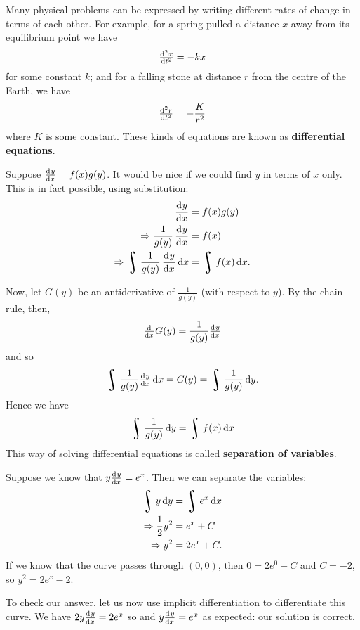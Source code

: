 


Many physical problems can be expressed by writing different rates of change in terms of each other. For example,
for a spring pulled a distance $ x $ away from its equilibrium point we have
\begin{displaymath}
  \od[2]{x}{t} = -kx
\end{displaymath}
for some constant $ k $; and for a falling stone at distance $ r $ from the centre of the Earth, we have
\begin{displaymath}
  \od[2]{r}{t} = -\frac{K}{r^2}
\end{displaymath}
where $ K $ is some constant. These kinds of equations are known as \textbf{differential equations}.

Suppose $ \od{y}{x} = f(x) g(y) $. It would be nice if we could find $ y $ in terms of $ x $ only. This
is in fact possible, using substitution:
\begin{align*}
  \dod{y}{x} &= f(x) g(y) \\
  \Rightarrow \frac{1}{g(y)} \dod{y}{x} &= f(x)\\
  \Rightarrow \rint \frac{1}{g(y)} \dod{y}{x} \dif{x} &= \rint f(x) \dif{x}.
\end{align*}

Now, let $ G(y) $ be an antiderivative of $ \frac{1}{g(y)} $ (with respect to $ y $). By the chain rule, then,
\begin{displaymath}
  \od{}{x} G(y) = \frac{1}{g(y)} \od{y}{x}
\end{displaymath}
and so
\begin{displaymath}
  \rint \frac{1}{g(y)} \od{y}{x} \dif{x} = G(y) = \rint \frac{1}{g(y)} \dif{y}.
\end{displaymath}
Hence we have
\begin{displaymath}
  \rint \frac{1}{g(y)} \dif{y} = \rint f(x) \dif{x}
\end{displaymath}
This way of solving differential equations is called \textbf{separation of variables}.

\begin{ex}
  Suppose we know that $ y\od{y}{x} = e^x $. Then we can separate the variables:
  \begin{align*}
    \rint y \dif{y} &= \rint e^x \dif{x}\\
    \Rightarrow \frac{1}{2} y^2 &= e^x + C\\
    \Rightarrow y^2 &= 2e^x + C.
  \end{align*}
  If we know that the curve passes through $ (0,0) $, then $ 0 = 2e^0 + C $ and $ C = -2 $, so $ y^2 = 2e^x - 2 $.

  To check our answer, let us now use implicit differentiation to differentiate this curve. We have $ 2y \od{y}{x} = 2e^x $ so and $ y \od{y}{x} = e^x $
  as expected: our solution is correct.
\end{ex}

